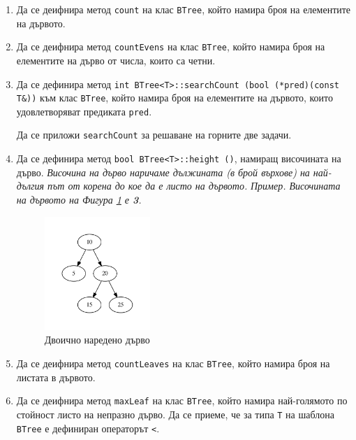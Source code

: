 \documentclass[12pt,a4paper]{article}
\begin{document}
\begin{enumerate}[]

	\item Да се деифнира метод \texttt{count} на клас \texttt{BTree}, който намира броя на елементите на дървото.

	\item Да се деифнира метод \texttt{countEvens} на клас \texttt{BTree}, който намира броя на елементите на дърво от числа, които са четни.


	\item Да се дефинира метод \texttt{int BTree<T>::searchCount (bool (*pred)(const T\&))} към клас \texttt{BTree}, който намира броя на елементите на дървото, които удовлетворяват предиката \texttt{pred}.

	Да се приложи \texttt{searchCount} за решаване на горните две задачи.

	\item Да се дефинира метод \texttt{bool BTree<T>::height ()}, намиращ височината на дърво. \textit{Височина на дърво наричаме дължината (в брой върхове) на най-дългия път от корена до кое да е листо на дървото.}
	\textit{Пример. Височината на дървото на Фигура \ref{fig:tree1} е \textbf{3}.}

  \begin{figure}
  \centering
	\includegraphics[width=4cm]{images/tree1}

	\caption{Двоично наредено дърво}
  \label{fig:tree1}
  \end{figure}


	\item Да се деифнира метод \texttt{countLeaves} на клас \texttt{BTree}, който намира броя на листата в дървото.

	\item Да се деифнира метод \texttt{maxLeaf} на клас \texttt{BTree}, който намира най-голямото по стойност листо на непразно дърво. Да се приеме, че за типа \texttt{T} на шаблона \texttt{BTree} е дефиниран операторът \texttt{<}.


\end{enumerate}
\end{document}
